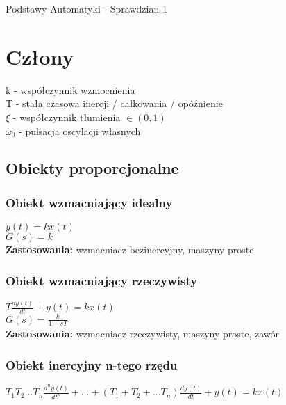 \documentclass[11pt]{article}
\date{}
\begin{document}
\begin{center}
	\LARGE Podstawy Automatyki - Sprawdzian 1 \\
\end{center}
\vspace{0.4cm}

\section{Człony}

k - współczynnik wzmocnienia\\
T - stała czasowa inercji / całkowania / opóźnienie\\
$\xi$ - współczynnik tłumienia $\in (0, 1)$\\
$\omega_0$ - pulsacja oscylacji własnych


\subsection{Obiekty proporcjonalne}

\subsubsection{Obiekt wzmacniający idealny}

$y(t) = k x(t)$\\

$G(s) = k$\\

\textbf{Zastosowania:} wzmacniacz bezinercyjny, maszyny proste

\subsubsection{Obiekt wzmacniający rzeczywisty}

$T \frac{dy(t)}{dt} + y(t) = k x(t)$\\

$G(s) = \frac{k}{1 + sT}$\\

\textbf{Zastosowania:} wzmacniacz rzeczywisty, maszyny proste, zawór

\subsubsection{Obiekt inercyjny n-tego rzędu}

$
T_1 T_2 ... T_n \frac{d^n y(t)}{dt^n} + ...
+ (T_1 + T_2 + ... T_n) \frac{d y(t)}{dt} + y(t) =
k x(t)
$\\
\end{document}

